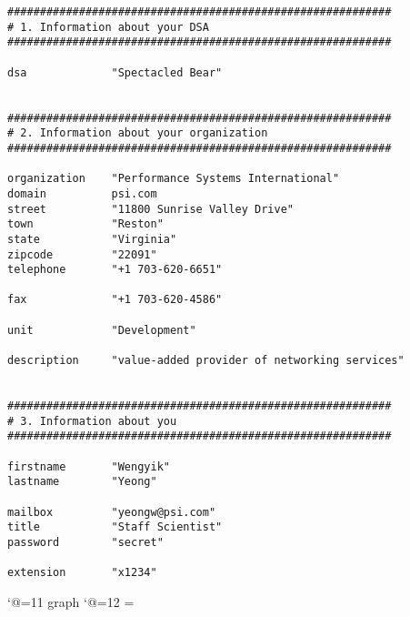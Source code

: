 
\smaller
\begin{verbatim}
###########################################################
# 1. Information about your DSA
###########################################################

dsa             "Spectacled Bear"


###########################################################
# 2. Information about your organization
###########################################################

organization    "Performance Systems International"
domain          psi.com
street          "11800 Sunrise Valley Drive"
town            "Reston"
state           "Virginia"
zipcode         "22091"
telephone       "+1 703-620-6651"

fax             "+1 703-620-4586"

unit            "Development"

description     "value-added provider of networking services"


###########################################################
# 3. Information about you
###########################################################

firstname       "Wengyik"
lastname        "Yeong"

mailbox         "yeongw@psi.com"
title           "Staff Scientist"
password        "secret"

extension       "x1234"
\end{verbatim}

\catcode`@=11
\expandafter\ifx\csname graph\endcsname\relax {}\box\chardef\insc@unt\graph\fi
\catcode`@=12
\setbox\graph=\empty
